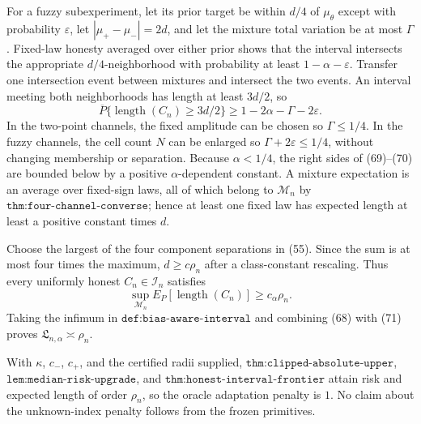 For a fuzzy subexperiment, let its prior target be within \(d/4\) of \(\mu_\theta\) except with probability \(\varepsilon\), let \(|\mu_+-\mu_-|=2d\), and let the mixture total variation be at most \(\Gamma\).  Fixed-law honesty averaged over either prior shows that the interval intersects the appropriate \(d/4\)-neighborhood with probability at least \(1-\alpha-\varepsilon\).  Transfer one intersection event between mixtures and intersect the two events.  An interval meeting both neighborhoods has length at least \(3d/2\), so
\[
\overline P\{\operatorname{length}(C_n)\geq3d/2\}
\geq1-2\alpha-\Gamma-2\varepsilon.                                     \tag{70}
\]
In the two-point channels, the fixed amplitude can be chosen so \(\Gamma\leq1/4\).  In the fuzzy channels, the cell count \(N\) can be enlarged so \(\Gamma+2\varepsilon\leq1/4\), without changing membership or separation.  Because \(\alpha<1/4\), the right sides of (69)--(70) are bounded below by a positive \(\alpha\)-dependent constant.  A mixture expectation is an average over fixed-sign laws, all of which belong to \(\mathcal M_n\) by \(\texttt{thm:four-channel-converse}\); hence at least one fixed law has expected length at least a positive constant times \(d\).

Choose the largest of the four component separations in (55).  Since the sum is at most four times the maximum, \(d\geq c\rho_n\) after a class-constant rescaling.  Thus every uniformly honest \(C_n\in\mathcal I_n\) satisfies
\[
\sup_{\mathcal M_n}E_P[\operatorname{length}(C_n)]
\geq c_\alpha\rho_n.                                                    \tag{71}
\]
Taking the infimum in \(\texttt{def:bias-aware-interval}\) and combining (68) with (71) proves \(\mathfrak L_{n,\alpha}\asymp\rho_n\).

With \(\kappa\), \(c_-\), \(c_+\), and the certified radii supplied, \(\texttt{thm:clipped-absolute-upper}\), \(\texttt{lem:median-risk-upgrade}\), and \(\texttt{thm:honest-interval-frontier}\) attain risk and expected length of order \(\rho_n\), so the oracle adaptation penalty is \(1\).  No claim about the unknown-index penalty follows from the frozen primitives.

